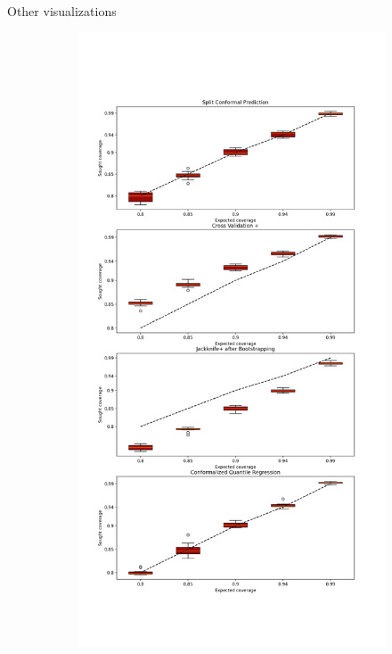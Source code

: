 \documentclass{beamer}
\begin{document}
\begin{frame}{Other visualizations}
\begin{figure}[ht]
\begin{subfigure}[b]{0.32\textwidth}
        \end{subfigure}
        \hfill %
        \begin{subfigure}[b]{0.32\textwidth} %
            \centering
            \includegraphics[width=\textwidth, height=1.9\textwidth]{Figures/regression/coverage-vs-alpha-regression-problem.png} %

\end{subfigure}
\end{figure}
\end{frame}
\end{document}
